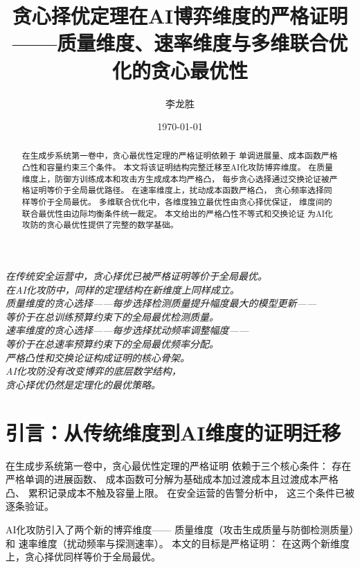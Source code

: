 \documentclass[11pt,a4paper]{article}
\title{贪心择优定理在AI博弈维度的严格证明\\
——质量维度、速率维度与多维联合优化的贪心最优性}
\author{李龙胜}
\date{\today}
\begin{document}
\maketitle

\begin{center}
\textit{
在传统安全运营中，贪心择优已被严格证明等价于全局最优。\\
在AI化攻防中，同样的定理结构在新维度上同样成立。\\
质量维度的贪心选择——每步选择检测质量提升幅度最大的模型更新——\\
等价于在总训练预算约束下的全局最优检测质量。\\
速率维度的贪心选择——每步选择扰动频率调整幅度——\\
等价于在总速率预算约束下的全局最优频率分配。\\
严格凸性和交换论证构成证明的核心骨架。\\
AI化攻防没有改变博弈的底层数学结构，\\
贪心择优仍然是定理化的最优策略。
}
\end{center}

\vspace{5mm}

\begin{abstract}
在生成步系统第一卷中，贪心最优性定理的严格证明依赖于
单调进展量、成本函数严格凸性和容量约束三个条件。
本文将该证明结构完整迁移至AI化攻防博弈维度。
在质量维度上，防御方训练成本和攻击方生成成本均严格凸，
每步贪心选择通过交换论证被严格证明等价于全局最优路径。
在速率维度上，扰动成本函数严格凸，
贪心频率选择同样等价于全局最优。
多维联合优化中，各维度独立最优性由贪心择优保证，
维度间的联合最优性由边际均衡条件统一裁定。
本文给出的严格凸性不等式和交换论证
为AI化攻防的贪心最优性提供了完整的数学基础。
\end{abstract}

\tableofcontents

\section{引言：从传统维度到AI维度的证明迁移}

在生成步系统第一卷中，贪心最优性定理的严格证明
依赖于三个核心条件：
存在严格单调的进展函数、
成本函数可分解为基础成本加过渡成本且过渡成本严格凸、
累积记录成本不触及容量上限。
在安全运营的告警分析中，
这三个条件已被逐条验证。

AI化攻防引入了两个新的博弈维度——
质量维度（攻击生成质量与防御检测质量）和
速率维度（扰动频率与探测速率）。
本文的目标是严格证明：
在这两个新维度上，贪心择优同样等价于全局最优。
\end{document}
